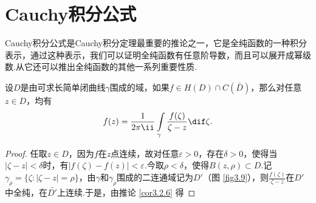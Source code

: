 \section{Cauchy积分公式\label{sec3.4}}
Cauchy积分公式是Cauchy积分定理最重要的推论之一，它是全纯函数的一种积分表示，通过这种表示，我们可以证明全纯函数有任意阶导数，而且可以展开成幂级数.从它还可以推出全纯函数的其他一系列重要性质.
\begin{theorem}\label{thm3.4.1}
设$D$是由可求长简单闭曲线$\gamma$围成的域，如果$f\in H(D)\cap C(\bar D)$，那么对任意$z\in D$，均有
\begin{equation}\label{eq3.4.1}
  f(z)=\frac1{2\pi\ii}\int\limits_\gamma\frac{f(\zeta)}{\zeta-z}\dif \zeta.
\end{equation}
\end{theorem}
\begin{proof}
任取$z\in D$，因为$f$在$z$点连续，故对任意$\varepsilon>0$，存在$\delta>0$，使得当$|\zeta-z|<\delta$时，有$|f(\zeta)-f(z)|<\varepsilon$.今取$\rho<\delta$，使得$B(z,\rho)\subset D$.记$\gamma_\rho=\{\zeta:|\zeta-z|=\rho\}$，由$\gamma$和$\gamma_{\rho}$围成的二连通域记为$D'$（图 \ref{fig3.9}），则$\frac{f(\zeta)}{\zeta-z}$在$D'$中全纯，在$\bar {D'}$上连续.于是，由推论 \ref{cor3.2.6} 得


\end{proof}

